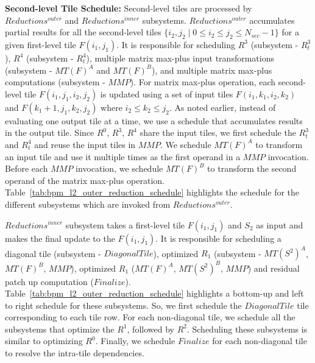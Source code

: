 \textbf{Second-level Tile Schedule:} Second-level tiles are processed by $Reductions^{outer}$ and $Reductions^{inner}$ subsystems. $Reductions^{outer}$ accumulates partial results for all the second-level tiles $\{ i_{2}, j_{2} \mid 0 \le i_{2} \le j_{2} \le N_{sec}-1 \}$ for a given first-level tile $F(i_{1}, j_{1})$. It is responsible for scheduling $R^{3}$ (subsystem - $R^{3}_{t}$), $R^{4}$ (subsystem - $R^{4}_{t}$), multiple matrix max-plus input transformations (subsystem - $MT(F)^{A}$ and $MT(F)^{B}$), and multiple matrix max-plus computations (subsystem - $MMP$). For matrix max-plus operation, each second-level tile $F(i_{1}, j_{1}, i_{2}, j_{2})$ is updated using a set of input tiles $F(i_{1}, k_{1}, i_{2}, k_{2})$ and $F(k_{1}+1, j_{1}, k_{2}, j_{2})$ where $i_{2} \le k_{2} \le j_{2}$. As noted earlier, instead of evaluating one output tile at a time, we use a schedule that accumulates results in the output tile. Since $R^{0}$, $R^{3}$, $R^{4}$ share the input tiles, we first schedule the $R^{3}_{t}$ and $R^{4}_{t}$ and reuse the input tiles in $MMP$. We schedule $MT(F)^{A}$ to transform an input tile and use it multiple times as the first operand in a $MMP$ invocation. Before each $MMP$ invocation, we schedule $MT(F)^{B}$ to transform the second operand of the matrix max-plus operation. Table~\ref{tab:bpm_l2_outer_reduction_schedule} highlights the schedule for the different subsystems which are invoked from $Reductions^{outer}$.
 

$Reductions^{inner}$ subsystem takes a first-level tile $F(i_{1}, j_{1})$ and $S_{2}$ as input and makes the final update to the $F(i_{1}, j_{1})$. It is responsible for scheduling a diagonal tile (subsystem - $DiagonalTile$), optimized $R_{1}$ (subsystem - $MT(S^{2})^{A}$, $MT(F)^{B}$, $MMP$), optimized $R_{1}$ ($MT(F)^{A}$, $MT(S^{2})^{B}$, $MMP$) and residual patch up computation ($Finalize$). Table~\ref{tab:bpm_l2_outer_reduction_schedule} highlights a bottom-up and left to right schedule for these subsystems. So, we first schedule the $DiagonalTile$ tile corresponding to each tile row. For each non-diagonal tile, we schedule all the subsystems that optimize the $R^{1}$, followed by $R^{2}$. Scheduling these subsystems is similar to optimizing $R^{0}$. Finally, we schedule $Finalize$ for each non-diagonal tile to resolve the intra-tile dependencies.

